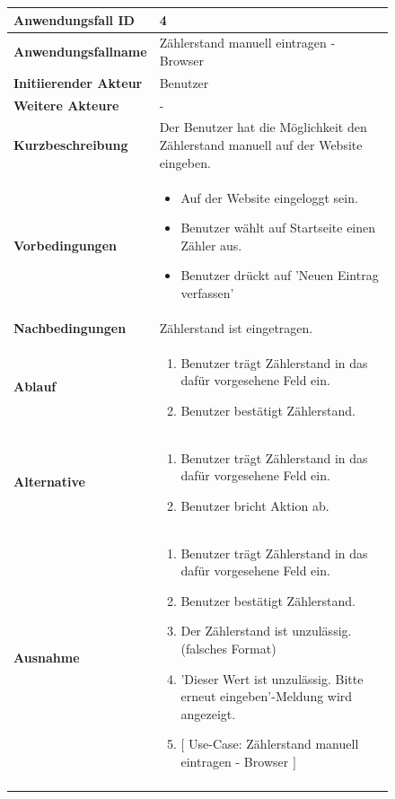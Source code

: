 \newpage

\begin{figure}[h]
	\centering
	\begin{tabularx}{\textwidth}{ X | X }
		\textbf{Anwendungsfall ID} & 4 \\ \hline
		\textbf{Anwendungsfallname} & Zählerstand manuell eintragen - Browser \\ \hline
		\textbf{Initiierender Akteur} & Benutzer \\ \hline
		\textbf{Weitere Akteure} & - \\ \hline
		\textbf{Kurzbeschreibung} & Der Benutzer hat die Möglichkeit den Zählerstand manuell auf der Website eingeben. \\ \hline
		\textbf{Vorbedingungen} & 
		\begin {itemize}
			\item Auf der Website eingeloggt sein. 
			\item Benutzer wählt auf Startseite einen Zähler aus.
			\item Benutzer drückt auf 'Neuen Eintrag verfassen'
		\end{itemize}\\ \hline
		\textbf{Nachbedingungen} & Zählerstand ist eingetragen. \\ \hline
		\textbf{Ablauf} &
		\begin{enumerate}
			\item Benutzer trägt Zählerstand in das dafür vorgesehene Feld ein.
			\item Benutzer bestätigt Zählerstand.
		\end{enumerate} \\ \hline
		\textbf{Alternative} & 
		\begin{enumerate}
			\item Benutzer trägt Zählerstand in das dafür vorgesehene Feld ein.
			\item Benutzer bricht Aktion ab.
		\end{enumerate} \\ \hline
		\textbf{Ausnahme} & 
		\begin{enumerate}
			\item Benutzer trägt Zählerstand in das dafür vorgesehene Feld ein.
			\item Benutzer bestätigt Zählerstand.
			\item Der Zählerstand ist unzulässig. (falsches Format)
			\item 'Dieser Wert ist unzulässig. Bitte erneut eingeben'-Meldung wird angezeigt.
			\item $\lbrack$ Use-Case: Zählerstand manuell eintragen - Browser $\rbrack$
		\end{enumerate} \\ &

	\end{tabularx}
\end{figure}


